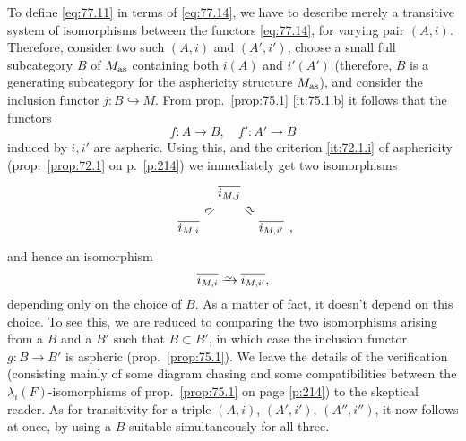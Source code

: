 To define \eqref{eq:77.11} in terms of \eqref{eq:77.14}, we have to
describe merely a transitive system of isomorphisms between the
functors \eqref{eq:77.14}, for varying pair $(A,i)$. Therefore,
consider two such $(A,i)$ and $(A',i')$, choose a small full
subcategory $B$ of $M_{\mathrm{as}}$ containing both $i(A)$ and $i'(A')$
(therefore, $B$ is a generating subcategory for the asphericity
structure $M_{\mathrm{as}}$), and consider the inclusion functor
$j:B\hookrightarrow M$. From prop.\ \ref{prop:75.1} \ref{it:75.1.b} it
follows that the functors
\[f: A\to B, \quad f':A'\to B\]
induced by $i,i'$ are aspheric. Using this, and the criterion
\ref{it:72.1.i} of asphericity (prop.\ \ref{prop:72.1} on p.\
\ref{p:214}) we immediately get two isomorphisms
\[\begin{tikzcd}[baseline=(O.base),column sep=tiny,row sep=small,arrows=phantom]
  & \overline{i_{M,j}} \ar[dl,swap,sloped,"\simeq"{description}]
    \ar[dr,sloped,"\simeq"{description}] & \\
  \overline{i_{M,i}} & & |[alias=O]| \overline{i_{M,i'}}
\end{tikzcd},\]
and hence an isomorphism
\[ \overline{i_{M,i}} \tosim \overline{i_{M,i'}},\]
depending only on the choice of $B$. As a matter of fact, it doesn't
depend on this choice. To see this, we are reduced to comparing the
two isomorphisms arising from a $B$ and a $B'$ such that $B\subset
B'$, in which case the inclusion functor $g:B\to B'$ is aspheric
(prop.\ \ref{prop:75.1}). We leave the details of the verification
(consisting mainly of some diagram chasing and some compatibilities
between the $\lambda_i(F)$-isomorphisms of prop.\ \ref{prop:75.1} on
page \ref{p:214}) to the skeptical reader. As for transitivity for a
triple $(A,i)$, $(A',i')$, $(A'',i'')$, it now follows at once, by
using a $B$ suitable simultaneously\pspage{241} for all three.

